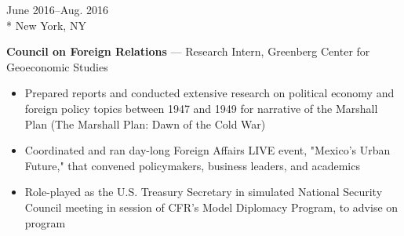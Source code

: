 \documentclass[a4paper,9pt]{article}
\begin{document}
\vspace{-3ex}
\begin{minipage}[t]{0.20\linewidth}
	\begin{small}
		\begin{spacing}{1.10}
			\begin{flushright}
				June 2016--Aug. 2016
				\\*
				\vspace*{2.5pt}
				New York, NY
			\end{flushright}
		\end{spacing}
	\end{small}
\end{minipage}
\hspace{4mm}
\begin{minipage}[t]{0.75\linewidth}
	\begin{small}
		\begin{spacing}{1.10}
			\begin{flushleft}
				\textbf{Council on Foreign Relations} --- Research Intern, Greenberg Center for Geoeconomic Studies
				\begin{itemize}[itemsep=0pt,topsep=2.5pt,leftmargin=*]
					\item Prepared reports and conducted extensive research on political economy and foreign policy topics between 1947 and 1949 for narrative of the Marshall Plan (The Marshall Plan: Dawn of the Cold War)
					\item Coordinated and ran day-long Foreign Affairs LIVE event, "Mexico's Urban Future," that convened policymakers, business leaders, and academics
					\item Role-played as the U.S. Treasury Secretary in simulated National Security Council meeting in session of CFR's Model Diplomacy Program, to advise on program
				\end{itemize}
			\end{flushleft}
		\end{spacing}
	\end{small}
\end{minipage}
\end{document}
